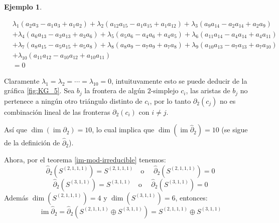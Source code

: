 \documentclass[12pt]{book}
\theoremstyle{definition}
\newtheorem{example}[theorem]{Ejemplo}
\DeclareMathOperator{\im}{im}
\newcounter{in}
\newcounter{ini}
\begin{document}
\begin{example}
\begin{footnotesize}
  \begin{align*}
    &\lambda_{1}(a_{2}a_{3}-a_{1}a_{3}+a_{1}a_{2})+\lambda_{2}(a_{12}a_{15}-a_{1}a_{15}+a_{1}a_{12})+\lambda_{3}(a_{9}a_{14}-a_{2}a_{14}+a_{2}a_{9})\\
    &+\lambda_{4}(a_{6}a_{13}-a_{3}a_{13}+a_{3}a_{6})+\lambda_{5}(a_{5}a_{6}-a_{4}a_{6}+a_{4}a_{5})+\lambda_{6}(a_{11}a_{14}-a_{4}a_{14}+a_{4}a_{11})\\
    &+\lambda_{7}(a_{8}a_{15}-a_{5}a_{15}+a_{5}a_{8})+\lambda_{8}(a_{8}a_{9}-a_{7}a_{9}+a_{7}a_{8})+\lambda_{9}(a_{10}a_{13}-a_{7}a_{13}+a_{7}a_{10})\\
    &+\lambda_{10}(a_{11}a_{12}-a_{10}a_{12}+a_{10}a_{11})\\
    &=0
  \end{align*}
\end{footnotesize}
Claramente $\lambda_{1}=\lambda_{2}=\cdots=\lambda_{10}=0$,
intuituvamente esto se puede deducir de la gráfica \ref{fig:KG_5}.
Sea $b_{j}$ la frontera de algún $2$-simplejo $c_{i}$, las aristas
de $b_{j}$ no pertenece a ningún otro triángulo distinto de $c_{i}$, por
lo tanto $\partial_{2}(c_{j})$ no es combinación lineal de las fronteras
$\partial_{2}(c_{i})$ con $i\neq j$.

Así que $\dim(\im\partial_{2})=10$, lo cual implica que
$\dim(\im\widehat\partial_{2})=10$ (se sigue de la definición de
$\widehat\partial_{2}$).

Ahora, por el teorema \ref{im-mod-irreducible} tenemos:
  $$\widehat\partial_{2}(S^{(2,1,1,1)})=S^{(2,1,1,1)} \quad \mbox{o }\quad \widehat\partial_{2}(S^{(2,1,1,1)})=0$$
  $$\widehat\partial_{2}(S^{(3,1,1)})=S^{(3,1,1)} \quad \mbox{o }\quad \widehat\partial_{2}(S^{(3,1,1)})=0$$
Además $\dim(S^{(2,1,1,1)})=4$ y $\dim(S^{(3,1,1)})=6$, entonces:
$$\im\widehat\partial_{2}=\widehat\partial_{2}(S^{(2,1,1,1)}\oplus S^{(3,1,1)})=S^{(2,1,1,1)}\oplus S^{(3,1,1)}$$

\end{example}
\end{document}
